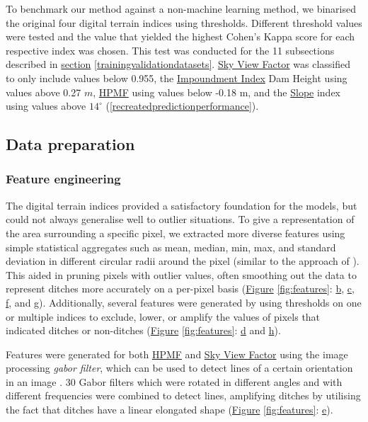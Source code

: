 \documentclass[11pt, review]{elsarticle} %
\begin{document}
To benchmark our method against a non-machine learning method, we binarised the original four digital terrain indices using thresholds. Different threshold values were tested and the value that yielded the highest Cohen's Kappa score for each respective index was chosen. This test was conducted for the 11 subsections described in \hyperref[trainingvalidationdatasets]{section} \ref{trainingvalidationdatasets}. \hyperref[skyviewfactor]{Sky View Factor} was classified to only include values below 0.955, the \hyperref[impoundment]{Impoundment Index} Dam Height using values above 0.27 $m$, \hyperref[hpmf]{HPMF} using values below -0.18 m, and the \hyperref[slope]{Slope} index using values above $14 ^{\circ}$ (\autoref{recreatedpredictionperformance}).

\subsection{Data preparation}

\subsubsection{Feature engineering}

The digital terrain indices provided a satisfactory foundation for the models, but could not always generalise well to outlier situations. To give a representation of the area surrounding a specific pixel, we extracted more diverse features using simple statistical aggregates such as mean, median, min, max, and standard deviation in different circular radii around the pixel (similar to the approach of \citet{roelens}). This aided in pruning pixels with outlier values, often smoothing out the data to represent ditches more accurately on a per-pixel basis (\hyperref[fig:features]{Figure} \ref{fig:features}: \hyperref[fig:features]{b}, \hyperref[fig:features]{c}, \hyperref[fig:features]{f}, and \hyperref[fig:features]{g}). Additionally, several features were generated by using thresholds on one or multiple indices to exclude, lower, or amplify the values of pixels that indicated ditches or non-ditches (\hyperref[fig:features]{Figure} \ref{fig:features}: \hyperref[fig:features]{d} and \hyperref[fig:features]{h}).

Features were generated for both \hyperref[hpmf]{HPMF} and \hyperref[skyviewfactor]{Sky View Factor} using the image processing \textit{gabor filter}, which can be used to detect lines of a certain orientation in an image \citep{gabor}. 30 Gabor filters which were rotated in different angles and with different frequencies were combined to detect lines, amplifying ditches by utilising the fact that ditches have a linear elongated shape (\hyperref[fig:features]{Figure} \ref{fig:features}: \hyperref[fig:features]{e}).
\end{document}
